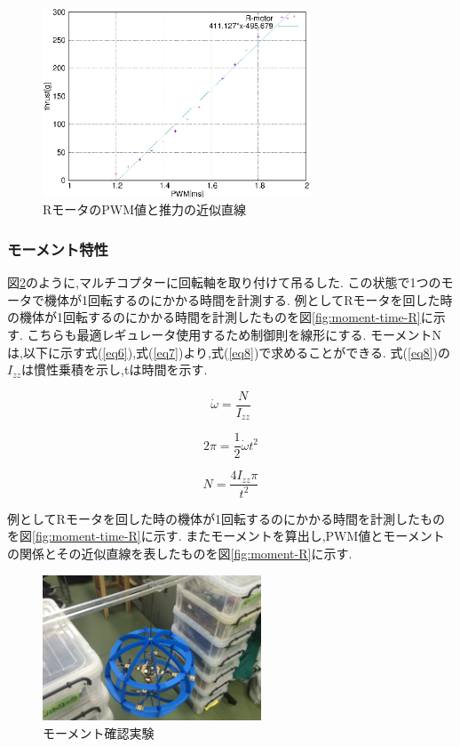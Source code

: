 \documentclass[12pt,oneside]{sotsuken_paper}
\begin{document}
\begin{figure}[htbp]
	\begin{center}
		\includegraphics[width=80mm]{image/thrust/thrust-R-kinji.eps}
		\caption{RモータのPWM値と推力の近似直線}
		\label{fig:thrust-R-kinji}
	\end{center}
\end{figure}

\subsubsection{モーメント特性}
図\ref{fig:moment-test}のように,マルチコプターに回転軸を取り付けて吊るした.
この状態で1つのモータで機体が1回転するのにかかる時間を計測する.
例としてRモータを回した時の機体が1回転するのにかかる時間を計測したものを図\ref{fig:moment-time-R}に示す.
こちらも最適レギュレータ使用するため制御則を線形にする.
モーメントNは,以下に示す式(\ref{eq6}),式(\ref{eq7})より,式(\ref{eq8})で求めることができる.
式(\ref{eq8})の\(I_{zz}\)は慣性乗積を示し,tは時間を示す.

\begin{equation}
	\dot{\omega} = \frac{N}{I_{zz}}
	\label{eq6}
\end{equation}

\begin{equation}
	2\pi = \frac{1}{2}\dot{\omega}{t^2}
	\label{eq7}
\end{equation}

\begin{equation}
	N = \frac{4{I_{zz}}\pi}{t^2}
	\label{eq8}
\end{equation}


例としてRモータを回した時の機体が1回転するのにかかる時間を計測したものを図\ref{fig:moment-time-R}に示す.
またモーメントを算出し,PWM値とモーメントの関係とその近似直線を表したものを図\ref{fig:moment-R}に示す.

\begin{figure}[htbp]
	\begin{center}
		\includegraphics[width=65mm]{image/moment/moment-test.jpg}
		\caption{モーメント確認実験}
		\label{fig:moment-test}
	\end{center}
\end{figure}
\end{document}
